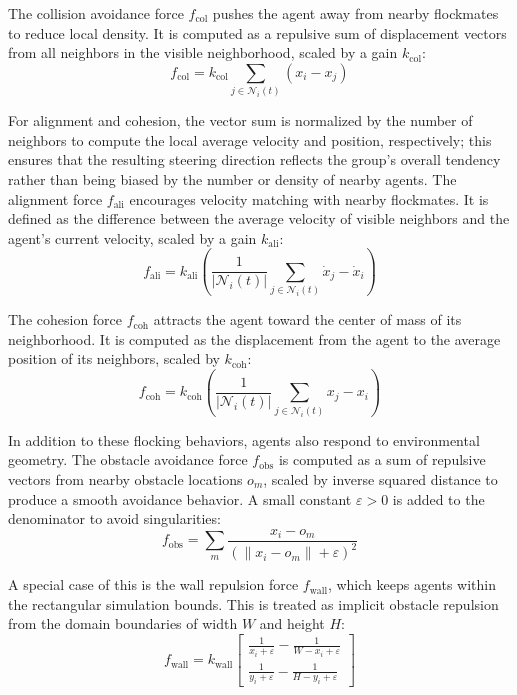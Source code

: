 \documentclass[12pt]{article}
\begin{document}
\begin{linenumbers}
The collision avoidance force \(f_{\text{col}}\) pushes the agent away from nearby flockmates to reduce local density. It is computed as a repulsive sum of displacement vectors from all neighbors in the visible neighborhood, scaled by a gain \(k_{\text{col}}\):
\[ f_\text{col} = k_\text{col} \sum_{j \in \mathcal{N}_i(t)} (x_i - x_j) \]

For alignment and cohesion, the vector sum is normalized by the number of neighbors to compute the local average velocity and position, respectively; this ensures that the resulting steering direction reflects the group's overall tendency rather than being biased by the number or density of nearby agents. The alignment force \(f_\text{ali}\) encourages velocity matching with nearby flockmates. It is defined as the difference between the average velocity of visible neighbors and the agent’s current velocity, scaled by a gain \(k_\text{ali}\): 
\[ f_\text{ali} = k_\text{ali} \left( \frac{1}{|\mathcal{N}_i(t)|} \sum_{j \in \mathcal{N}_i(t)} \dot{x}_j - \dot{x}_i \right) \]

The cohesion force \(f_\text{coh}\) attracts the agent toward the center of mass of its neighborhood. It is computed as the displacement from the agent to the average position of its neighbors, scaled by \(k_\text{coh}\): 
\[ f_\text{coh} = k_\text{coh} \left( \frac{1}{|\mathcal{N}_i(t)|} \sum_{j \in \mathcal{N}_i(t)} x_j - x_i \right) \]

In addition to these flocking behaviors, agents also respond to environmental geometry. The obstacle avoidance force \(f_{\text{obs}}\) is computed as a sum of repulsive vectors from nearby obstacle locations \(o_m\), scaled by inverse squared distance to produce a smooth avoidance behavior. A small constant \(\varepsilon > 0\) is added to the denominator to avoid singularities:
\[ f_\text{obs} = \sum_m \frac{x_i - o_m}{\left( \|x_i - o_m\| + \varepsilon \right)^2} \]

A special case of this is the wall repulsion force \(f_\text{wall}\), which keeps agents within the rectangular simulation bounds. This is treated as implicit obstacle repulsion from the domain boundaries of width \(W\) and height \(H\): \[ f_\text{wall} = k_\text{wall} \begin{bmatrix}
\frac{1}{x_i + \varepsilon} - \frac{1}{W - x_i + \varepsilon} \\
\frac{1}{y_i + \varepsilon} - \frac{1}{H - y_i + \varepsilon}
\end{bmatrix} \]


\end{linenumbers}
\end{document}
